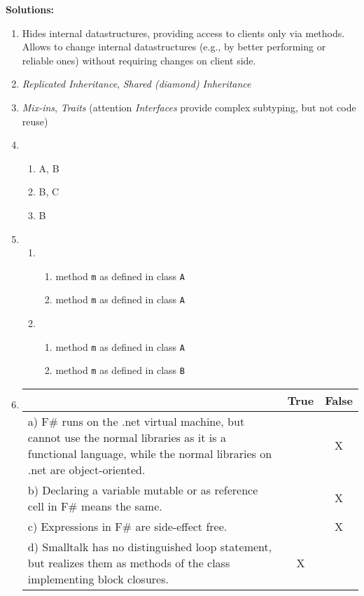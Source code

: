 \documentclass{article}
\newcommand{\solution}[1] {\textbf{Solutions:}\\ #1}
\begin{document}
\solution{
\begin{enumerate}
\item Hides internal datastructures, providing access to clients only
  via methods. Allows to change internal datastructures (e.g., by
  better performing or reliable ones) without requiring changes on
  client side.
\item \emph{Replicated Inheritance}, \emph{Shared (diamond)
    Inheritance}
\item \emph{Mix-ins}, \emph{Traits} (attention \emph{Interfaces}
  provide complex subtyping, but not code reuse)
\item 
    \begin{enumerate}
      \item A, B
      \item B, C
      \item B
    \end{enumerate}
\item 
    \begin{enumerate}
    \item 
    \begin{enumerate}
    \item method \lstinline!m! as defined in class \lstinline!A!
    \item method \lstinline!m! as defined in class \lstinline!A!
  \end{enumerate}
    \item 
    \begin{enumerate}
    \item method \lstinline!m! as defined in class \lstinline!A!
    \item method \lstinline!m! as defined in class \lstinline!B!
    \end{enumerate}
    \end{enumerate}
\item
      \begin{tabular}{|p{6cm}|c|c|}\hline
      & True & False \\ \hline
      a) F\# runs on the \textsf{.net} virtual machine, but cannot use the
      normal libraries as it is a functional language, while the normal
      libraries on \textsf{.net} are object-oriented. & & X \\\hline
      b) Declaring a variable mutable or as reference cell in F\# means
      the same. & & X \\\hline
      c) Expressions in F\# are side-effect free. & & X \\\hline
      d) Smalltalk has no distinguished loop statement, but realizes
      them as methods of the class implementing block closures.  & X & \\\hline
   \end{tabular}\\

\end{enumerate}
}
\end{document}

